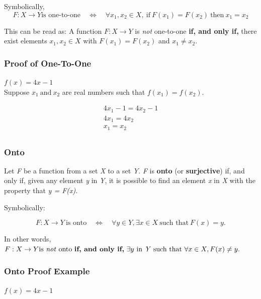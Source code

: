 \documentclass[12pt]{article}
\begin{document}
Symbolically,
\begin{equation*}
F: X \rightarrow Y \text{is one-to-one} \quad \Leftrightarrow \quad \forall x_1, x_2 \in X, \ \text{if} \ F(x_1) = F(x_2) \ \text{then} \ x_1 = x_2
\end{equation*}

This can be read as: A function $F: X \rightarrow Y$ is \textit{not} one-to-one \textbf{if, and only if,} 
there exist elements $x_1, x_2 \in X$ with $F(x_1) = F(x_2)$ and $x_1 \neq x_2$.

\subsubsection*{Proof of One-To-One}
$f(x) = 4x - 1$ \\

\noindent
Suppose $x_1 \ \text{and} \ x_2$ are real numbers such that $f(x_1) = f(x_2)$.

\begin{align}
4x_1 - 1 = 4x_2 - 1 \\
4x_1 = 4x_2 \\
x_1 = x_2 \\
\end{align}

\subsubsection*{Onto}
Let \textit{F} be a function from a set \textit{X} to a set \textit{Y}. \textit{F} is \textbf{onto} (or \textbf{surjective}) if, and only if, given any element \textit{y} in \textit{Y}, it is possible to find an element \textit{x} in \textit{X} with the property that \textit{y = F(x)}.

Symbolically:

\begin{equation*}
F: X \rightarrow Y \ \text{is onto} \quad \Leftrightarrow \quad \forall y \in Y, \exists x \in X \ \text{such that} \ F(x) = y.
\end{equation*}

In other words, $F: X \rightarrow Y \text{is \textit{not} onto} \ \text{\textbf{if, and only if,}} \ \exists y \ \text{in \textit{Y} such that} \ \forall x \in X, F(x) \neq y.$

\subsubsection*{Onto Proof Example}
$f(x) = 4x - 1$
\end{document}
